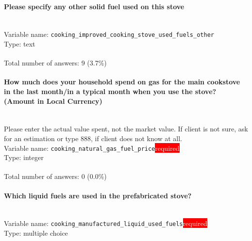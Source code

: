 \documentclass[11.5pt, a4paper]{scrartcl}
\begin{document}
\paragraph{Please specify any other solid fuel used on this stove}
\  \\Variable name: \texttt{cooking\_improved\_cooking\_stove\_used\_fuels\_other}\\
Type: text\\
\\Total number of answers: 9 (3.7\%)
\\[0.2em]\paragraph{How much does your household spend on gas for the main cookstove in the last month/in a typical month when you use the stove? (Amount in Local Currency) }
\ \\ {\small Please enter the actual value spent, not the market value. If client is not sure, ask for an estimation or type 888, if client does not know at all. }
\  \\Variable name: \texttt{cooking\_natural\_gas\_fuel\_price}\hfill\colorbox{red}{\small{\textcolor{white}{required}}}\\
 Type: integer\\
\\Total number of answers: 0 (0.0\%)
\\[0.2em]\paragraph{Which liquid fuels are used in the prefabricated stove?}
\  \\Variable name: \texttt{cooking\_manufactured\_liquid\_used\_fuels}\hfill\colorbox{red}{\small{\textcolor{white}{required}}}\\
 Type: multiple choice\\
\end{document}
